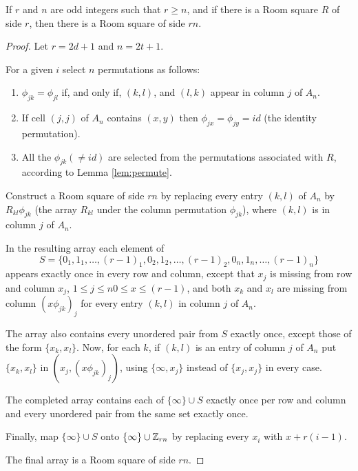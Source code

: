 \begin{theorem}
\label{thm:wallis}
If $r$ and $n$ are odd integers such that $r \geq n$, and if there is a Room square $R$ of side $r$, then there is a Room square of side $rn$.
\end{theorem}

\begin{proof}
Let $r = 2d + 1$ and $n = 2t + 1$.

For a given $i$ select $n$ permutations as follows:
\begin{enumerate}
  \item{$\phi _{jk} = \phi _{jl}$ if, and only if, $(k, l)$, and $(l, k)$ appear in column $j$ of $A_n$.}
  \item{If cell $(j, j)$ of $A_n$ contains $(x, y)$ then $\phi _{jx} = \phi _{jy} = id$ (the identity permutation).}
  \item{All the $\phi _{jk} (\neq id)$ are selected from the permutations associated with $R$, according to Lemma \ref{lem:permute}.}
\end{enumerate}

Construct a Room square of side $rn$ by replacing every entry $(k, l)$ of $A_n$ by $R_{kl} \phi _{jk}$ (the array $R_{kl}$ under the column permutation $\phi _{jk}$), where $(k, l)$ is in column $j$ of $A_n$.

In the resulting array each element of
\begin{equation*}
  S = \{0_1, 1_1, \ldots, (r - 1)_1, 0_2, 1_2, \ldots, (r - 1)_2, 0_n, 1_n, \ldots, (r - 1)_n\}
\end{equation*}
appears exactly once in every row and column, except that $x_{j}$ is missing from row and column $x_{j}$, $1 \leq j \leq n 0 \leq x \leq (r - 1)$, and both $x_{k}$ and $x_{l}$ are missing from column $(x \phi _{jk})_j$ for every entry $(k, l)$ in column $j$ of $A_{n}$.

The array also contains every unordered pair from $S$ exactly once, except those of the form $\{x_{k}, x_{l}\}$.
Now, for each $k$, if $(k, l)$ is an entry of column $j$ of $A_{n}$ put $\{x_{k}, x_{l}\}$ in $(x_{j}, (x \phi _{jk})_j)$, using $\{\infty, x_{j}\}$ instead of $\{x_{j}, x_{j}\}$ in every case.

The completed array contains each of $\{\infty\} \cup S$ exactly once per row and column and every unordered pair from the same set exactly once.

Finally, map $\{\infty\} \cup S$ onto $\{\infty \} \cup \mathbb{Z}_{rn}$ by replacing every $x_{i}$ with $x + r(i - 1)$.

The final array is a Room square of side $rn$.
\end{proof}


